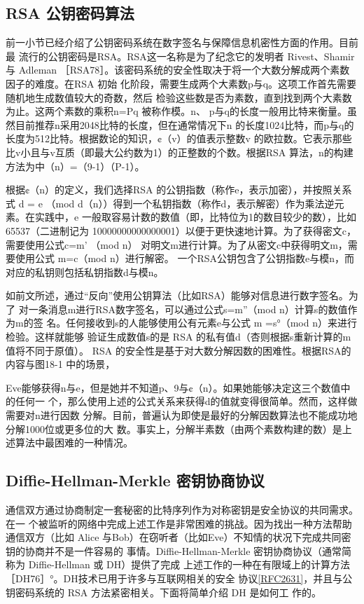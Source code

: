 \subsection{RSA 公钥密码算法}

前一小节已经介绍了公钥密码系统在数字签名与保障信息机密性方面的作用。目前最
流行的公钥密码是RSA。RSA这一名称是为了纪念它的发明者 Rivest、Shamir 与 Adleman
［RSA78］。该密码系统的安全性取决于将一个大数分解成两个素数因子的难度。在RSA 初始
化阶段，需要生成两个大素数p与q。这项工作首先需要随机地生成数值较大的奇数，然后
检验这些数是否为素数，直到找到两个大素数为止。这两个素数的乘积n=Pq 被称作模。n、
p与q的长度一般用比特来衡量。虽然目前推荐n采用2048比特的长度，但在通常情况下n
的长度1024比特，而p与q的长度为512比特。根据数论的知识，¢（v）的值表示整数v
的欧拉数。它表示那些比v小且与v互质（即最大公约数为1）的正整数的个数。根据RSA
算法，n的构建方法为中（n）=（9-1）（P-1）。

根据¢（n）的定义，我们选择RSA 的公钥指数（称作e，表示加密），并按照关系式
d = e （mod d（n））得到一个私钥指数（称作d，表示解密）作为乘法逆元素。在实践中，e
一般取容易计数的数值（即，比特位为1的数目较少的数），比如65537（二进制记为
10000000000000001）以便于更快速地计算。为了获得密文c，需要使用公式c=m' （mod n）
对明文m进行计算。为了从密文c中获得明文m，需要使用公式 m=c（mod n）进行解密。
一个RSA公钥包含了公钥指数e与模n，而对应的私钥则包括私钥指数d与模n。

如前文所述，通过“反向”使用公钥算法（比如RSA）能够对信息进行数字签名。为了
对一条消息m进行RSA数字签名，可以通过公式s=m”（mod n）计算s的数值作为m的签
名。任何接收到s的人能够使用公有元素e与公式 m =s°（mod n）来进行检验。这样就能够
验证生成数值s的是 RSA 的私有值d（杏则根据s重新计算的m 值将不同于原值）。
RSA 的安全性是基于对大数分解因数的困难性。根据RSA的内容与图18-1 中的场景，

Eve能够获得n与e，但是她并不知道p、9与¢（n）。如果她能够决定这三个数值中的任何一
个，那么使用上述的公式关系来获得d的值就变得很简单。然而，这样做需要对n进行因数
分解。目前，普遍认为即使是最好的分解因数算法也不能成功地分解1000位或更多位的大
数。事实上，分解半素数（由两个素数构建的数）是上述算法中最困难的一种情况。

\subsection{Diffie-Hellman-Merkle 密钥协商协议}

通信双方通过协商制定一套秘密的比特序列作为对称密钥是安全协议的共同需求。在一
个被监听的网络中完成上述工作是非常困难的挑战。因为找出一种方法帮助通信双方（比如
Alice 与Bob）在窃听者（比如Eve）不知情的状况下完成共同密钥的协商并不是一件容易的
事情。Diffie-Hellman-Merkle 密钥协商协议（通常简称为 Diffie-Hellman 或 DH）提供了完成
上述工作的一种在有限域上的计算方法［DH76］°。DH技术已用于许多与互联网相关的安全
协议\href{https://www.rfc-editor.org/rfc/rfc2631}{[RFC2631]}，并且与公钥密码系统的 RSA 方法紧密相关。下面将简单介绍 DH 是如何工
作的。

